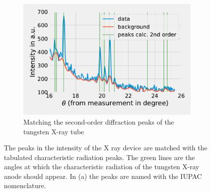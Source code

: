 \begin{figure}
    \begin{subfigure}[b]{0.85\textwidth}
      \includegraphics[width = \textwidth]{Programming/Absorption/MatchLine2.pdf}      
      \caption{Matching the second-order diffraction peaks of the tungsten X-ray tube}
      \label{fig:MatchLine2}
    \end{subfigure}
    \caption{The peaks in the intensity of the X ray device are matched with the tabulated characteristic radiation peaks. The green lines are the angles at which the characteristic radiation of the tungsten X-ray anode should appear. In (a) the peaks are named with the IUPAC nomenclature.}
    \label{fig:Peaks}
\end{figure}

